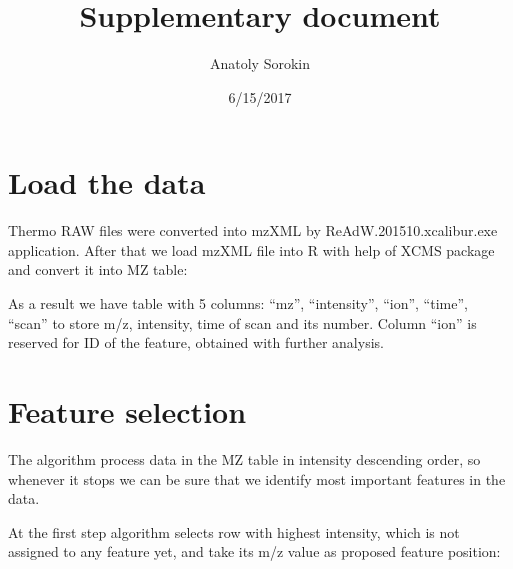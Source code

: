 \documentclass[]{article}
\title{Supplementary document}
\author{Anatoly Sorokin}
\date{6/15/2017}
\newenvironment{Shaded}{\begin{snugshade}}{\end{snugshade}}
\newcommand{\KeywordTok}[1]{\textcolor[rgb]{0.13,0.29,0.53}{\textbf{#1}}}
\newcommand{\StringTok}[1]{\textcolor[rgb]{0.31,0.60,0.02}{#1}}
\newcommand{\OperatorTok}[1]{\textcolor[rgb]{0.81,0.36,0.00}{\textbf{#1}}}
\newcommand{\NormalTok}[1]{#1}
\begin{document}
\maketitle

{
\setcounter{tocdepth}{2}
\tableofcontents
}
\section{Load the data}\label{load-the-data}

Thermo RAW files were converted into mzXML by ReAdW.201510.xcalibur.exe
application. After that we load mzXML file into R with help of XCMS
package and convert it into MZ table:

\begin{Shaded}
\end{Shaded}

As a result we have table with 5 columns: ``mz'', ``intensity'',
``ion'', ``time'', ``scan'' to store m/z, intensity, time of scan and
its number. Column ``ion'' is reserved for ID of the feature, obtained
with further analysis.

\section{Feature selection}\label{feature-selection}

The algorithm process data in the MZ table in intensity descending
order, so whenever it stops we can be sure that we identify most
important features in the data.

At the first step algorithm selects row with highest intensity, which is
not assigned to any feature yet, and take its m/z value as proposed
feature position:

\begin{Shaded}
\end{Shaded}
\end{document}
